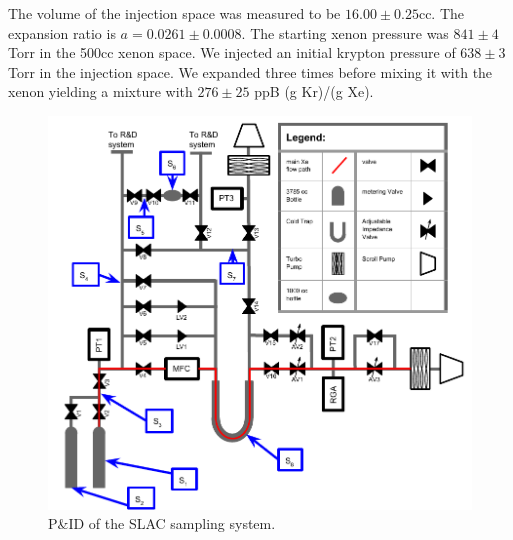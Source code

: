 \documentclass[12pt]{article}
\begin{document}
The volume of the injection space was measured to be $16.00 \pm 0.25$cc. The expansion ratio is $a=0.0261 \pm0.0008$. The starting xenon pressure was $841\pm4$ Torr in the 500cc xenon space. We injected an initial krypton pressure of $638\pm3$ Torr in the injection space. We expanded three times before mixing it with the xenon yielding a mixture with $276\pm25$ ppB (g Kr)/(g Xe).
\begin{figure}[h!]
  \includegraphics[width=\linewidth]{Figures/SLAC_ColdTrap_diagram_wvols.pdf}
  \caption{P\&ID of the SLAC sampling system.}
  \label{fig:SLACpid}
\end{figure}
\end{document}
